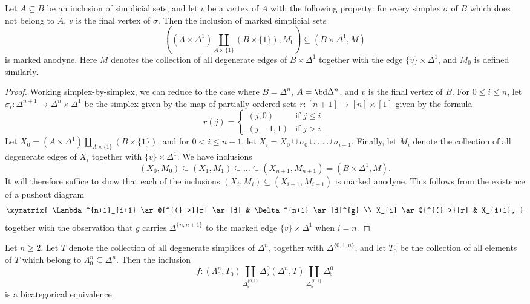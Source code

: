 \begin{lemma}\label{urplee}
Let $A \subseteq B$ be an inclusion of simplicial sets, and let
$v$ be a vertex of $A$ with the following property: for every simplex
$\sigma$ of $B$ which does not belong to $A$, $v$ is the final vertex of $\sigma$.
Then the inclusion of marked simplicial sets
$$ (( A \times \Delta^1) \coprod_{A \times \{1\} } (B \times \{1\}), M_0)
\subseteq (B \times \Delta^1, M)$$
is marked anodyne. Here $M$ denotes the collection of all degenerate edges
of $B \times \Delta^1$ together with the edge $\{v\} \times \Delta^1$, and 
$M_0$ is defined similarly.
\end{lemma}

\begin{proof}
Working simplex-by-simplex, we can reduce to the case where $B = \Delta^n$,
$A = \bd \Delta^n$, and $v$ is the final vertex of $B$. For $0 \leq i \leq n$, let
$\sigma_i: \Delta^{n+1} \rightarrow \Delta^n \times \Delta^1$ be the simplex given by the map
of partially ordered sets $r: [n+1] \rightarrow [n] \times [1]$ given by the formula
$$ r(j) = \begin{cases} (j, 0) & \text{if } j \leq i \\
(j-1, 1) & \text{if } j > i. \end{cases}$$
Let $X_0 = ( A \times \Delta^1) \coprod_{A \times \{1\} } (B \times \{1\})$, and for
$0 < i \leq n+1$, let $X_{i} = X_0 \cup \sigma_0 \cup \ldots \cup \sigma_{i-1}$.
Finally, let $M_i$ denote the collection of all degenerate edges of $X_i$ together with
$\{v\} \times \Delta^1$. We have inclusions
$$(X_0, M_0) \subseteq (X_1, M_1) \subseteq \ldots \subseteq (X_{n+1}, M_{n+1})
= ( B \times \Delta^1, M).$$
It will therefore suffice to show that each of the inclusions $(X_i, M_i) \subseteq (X_{i+1}, M_{i+1})$ is marked anodyne. This follows from the existence of a pushout diagram
$$ \xymatrix{ \Lambda^{n+1}_{i+1} \ar@{^{(}->}[r] \ar[d] & \Delta^{n+1} \ar[d]^{g} \\
X_{i} \ar@{^{(}->}[r] & X_{i+1}, }$$
together with the observation that $g$ carries $\Delta^{ \{n, n+1\} }$ to
the marked edge $\{v\} \times \Delta^1$ when $i = n$.
\end{proof}

\begin{lemma}\label{prewise}
Let $n \geq 2$. Let $T$ denote the collection of all degenerate simplices of
$\Delta^n$, together with $\Delta^{ \{0,1,n \} }$, and let $T_0$ be the collection of
all elements of $T$ which belong to $\Lambda^n_0 \subseteq \Delta^n$.
Then the inclusion
$$ f: ( \Lambda^n_0, T_0) \coprod_{ \Delta^{ \{0,1\} }_{\flat} } \Delta^0_{\flat}
( \Delta^n, T) \coprod_{ \Delta^{ \{0,1\} }_{\flat} } \Delta^0_{\flat} $$
is a bicategorical equivalence.
\end{lemma}

